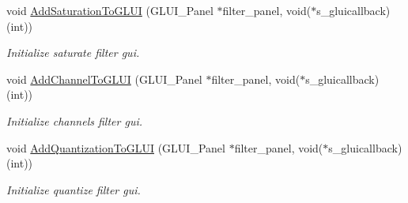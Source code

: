 \begin{DoxyCompactItemize}
void \hyperlink{classimage__tools_1_1FilterManager_a7d6d4cefdcf8cf23ae5467ed220d8ffe}{Add\+Saturation\+To\+G\+L\+UI} (G\+L\+U\+I\+\_\+\+Panel $\ast$filter\+\_\+panel, void($\ast$s\+\_\+gluicallback)(int))
\begin{DoxyCompactList}\small\item\em Initialize saturate filter gui. \end{DoxyCompactList}\item 
void \hyperlink{classimage__tools_1_1FilterManager_afe7ab6a2f6de62dc1b3b4c1d4350ddbe}{Add\+Channel\+To\+G\+L\+UI} (G\+L\+U\+I\+\_\+\+Panel $\ast$filter\+\_\+panel, void($\ast$s\+\_\+gluicallback)(int))
\begin{DoxyCompactList}\small\item\em Initialize channels filter gui. \end{DoxyCompactList}\item 
void \hyperlink{classimage__tools_1_1FilterManager_ae13d0c9858da16b283bdf71ee2b4ad8f}{Add\+Quantization\+To\+G\+L\+UI} (G\+L\+U\+I\+\_\+\+Panel $\ast$filter\+\_\+panel, void($\ast$s\+\_\+gluicallback)(int))
\begin{DoxyCompactList}\small\item\em Initialize quantize filter gui. \end{DoxyCompactList}\end{DoxyCompactItemize}
